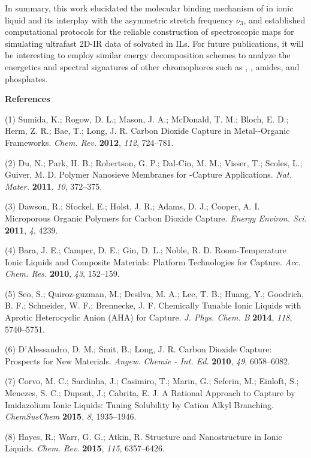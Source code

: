 In summary, this work elucidated the molecular binding mechanism of  in \ce{[C4C1im][PF6]} ionic liquid and its interplay with the  asymmetric stretch frequency \(\nu_{3}\), and established computational protocols for the reliable construction of spectroscopic maps for simulating ultrafast 2D-IR data of  solvated in ILs. For future publications, it will be interesting to employ similar energy decomposition schemes to analyze the energetics and spectral signatures of other chromophores such as , , amides, and phosphates.

\textbf{References}

(1) Sumida, K.; Rogow, D. L.; Mason, J. A.; McDonald, T. M.; Bloch, E.  D.; Herm, Z. R.; Bae, T.; Long, J. R. Carbon Dioxide Capture in Metal-\/-Organic Frameworks. \emph{Chem. Rev.} \textbf{2012}, \emph{112}, 724--781.

(2) Du, N.; Park, H. B.; Robertson, G. P.; Dal-Cin, M. M.; Visser, T.; Scoles, L.; Guiver, M. D. Polymer Nanosieve Membranes for -Capture Applications. \emph{Nat. Mater.}  \textbf{2011}, \emph{10}, 372--375.

(3) Dawson, R.; St\"{}ockel, E.; Holst, J. R.; Adams, D. J.; Cooper, A. I.  Microporous Organic Polymers for Carbon Dioxide Capture. \emph{Energy Environ. Sci.} \textbf{2011}, \emph{4}, 4239.

(4) Bara, J. E.; Camper, D. E.; Gin, D. L.; Noble, R. D.  Room-Temperature Ionic Liquids and Composite Materials: Platform Technologies for  Capture. \emph{Acc. Chem. Res.}  \textbf{2010}, \emph{43}, 152--159.

(5) Seo, S.; Quiroz-guzman, M.; Desilva, M. A.; Lee, T. B.; Huang, Y.; Goodrich, B. F.; Schneider, W. F.; Brennecke, J. F. Chemically Tunable Ionic Liquids with Aprotic Heterocyclic Anion (AHA) for  Capture. \emph{J. Phys. Chem. B} \textbf{2014}, \emph{118}, 5740--5751.

(6) D'Alessandro, D. M.; Smit, B.; Long, J. R. Carbon Dioxide Capture: Prospects for New Materials. \emph{Angew. Chemie - Int. Ed.}  \textbf{2010}, \emph{49}, 6058--6082.

(7) Corvo, M. C.; Sardinha, J.; Casimiro, T.; Marin, G.; Seferin, M.; Einloft, S.; Menezes, S. C.; Dupont, J.; Cabrita, E. J. A Rational Approach to  Capture by Imidazolium Ionic Liquids: Tuning  Solubility by Cation Alkyl Branching.  \emph{ChemSusChem} \textbf{2015}, \emph{8}, 1935--1946.

(8) Hayes, R.; Warr, G. G.; Atkin, R. Structure and Nanostructure in Ionic Liquids. \emph{Chem. Rev.} \textbf{2015}, \emph{115}, 6357--6426.

